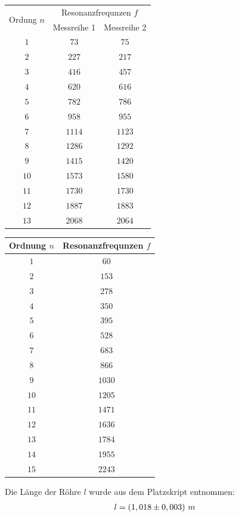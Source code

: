 \begin{center}
\begin{tabular}{c|cc}
\multirow{2}{*}{Ordung \(n\)} & \multicolumn{2}{c}{Resonanzfrequnzen \(f\)}\\
 & Messreihe 1 & Messreihe 2 \\\hline
\(1\) & \(73\) & \(75\) \\ 
\(2\) & \(227\) & \(217\) \\ 
\(3\) & \(416\) & \(457\) \\ 
\(4\) & \(620\) & \(616\) \\ 
\(5\) & \(782\) & \(786\) \\ 
\(6\) & \(958\) & \(955\) \\ 
\(7\) & \(1114\) & \(1123\) \\ 
\(8\) & \(1286\) & \(1292\) \\ 
\(9\) & \(1415\) & \(1420\) \\ 
\(10\) & \(1573\) & \(1580\) \\ 
\(11\) & \(1730\) & \(1730\) \\ 
\(12\) & \(1887\) & \(1883\) \\ 
\(13\) & \(2068\) & \(2064\) \\
\end{tabular}
\vspace{1cm}
\begin{tabular}{c|c}
Ordnung \(n\) & Resonanzfrequnzen \(f\) \\\hline
\(1\) & \(60\) \\ 
\(2\) & \(153\) \\ 
\(3\) & \(278\) \\ 
\(4\) & \(350\) \\ 
\(5\) & \(395\) \\ 
\(6\) & \(528\) \\ 
\(7\) & \(683\) \\ 
\(8\) & \(866\) \\ 
\(9\) & \(1030\) \\ 
\(10\) & \(1205\) \\ 
\(11\) & \(1471\) \\ 
\(12\) & \(1636\) \\ 
\(13\) & \(1784\) \\ 
\(14\) & \(1955\) \\ 
\(15\) & \(2243\) \\
\end{tabular}
\end{center}
Die Länge der Röhre \(l\) wurde aus dem Platzskript entnommen:
\begin{align}
l = \left(1,018 \pm 0,003\right)\,m \notag
\end{align}

